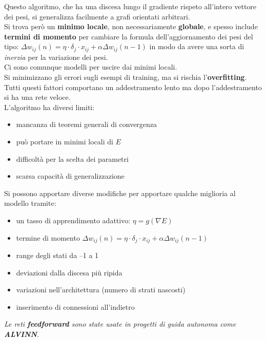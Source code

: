 Questo algoritmo, che ha una discesa lungo il gradiente rispeto all'intero vettore dei pesi, si generalizza facilmente a grafi orientati arbitrari.\\ Si trova però un \textbf{minimo locale}, non necessariamente \textbf{globale}, e spesso include \textbf{termini di momento} per cambiare la formula dell'aggiornamento dei pesi del tipo: 
$\Delta w_{ij}(n)=\eta\cdot \delta_j\cdot x_{ij}+\alpha\Delta w_{ij}(n-1)$ in modo da avere una sorta di \textit{inerzia} per la variazione dei pesi.\\ 
Ci sono comunque modelli per uscire dai minimi locali.\\ 
Si minimizzano gli errori sugli esempi di training, ma si rischia l'\textbf{overfitting}.\\ 
Tutti questi fattori comportano un addestramento lento ma dopo l'addestramento si ha una rete veloce.\\

L'algoritmo ha diversi limiti:
\begin{itemize}
  \item mancanza di teoremi generali di convergenza
  \item può portare in minimi locali di $E$ 
  \item difficoltà per la scelta dei parametri 
  \item scarsa capacità di generalizzazione 
\end{itemize}
Si possono apportare diverse modifiche per apportare qualche miglioria al modello tramite:
\begin{itemize}
  \item un tasso di apprendimento adattivo: $\eta=g(\nabla E)$
  \item termine di momento $\Delta w_{ij}(n)=\eta\cdot \delta_j\cdot x_{ij}+\alpha\Delta w_{ij}(n-1)$
  \item range degli stati da –1 a 1 
  \item deviazioni dalla discesa più ripida 
  \item variazioni nell'architettura (numero di strati nascosti)
  \item inserimento di connessioni all'indietro
\end{itemize}
\textit{Le reti \textbf{feedforward} sono state usate in progetti di guida autonoma come \textbf{ALVINN}.}\\
